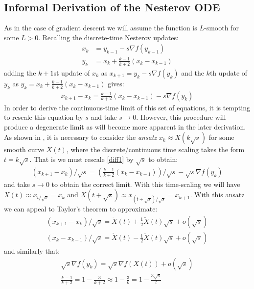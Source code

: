 \documentclass{article}
\begin{document}
\subsection{Informal Derivation of the Nesterov ODE}
As in the case of gradient descent we will assume the function is $L$-smooth for some $L > 0$. Recalling the discrete-time Nesterov updates:
\begin{align}
    x_k &= y_{k-1} - s \nabla f(y_{k-1})\\
    y_k &= x_k + \frac{k-1}{k+2} (x_k - x_{k-1}) \label{nesterov}
\end{align}
adding the $k+1$st update of $x_k$ as $x_{k+1} = y_k - s \nabla f(y_k)$ and the $k$th update of $y_k$ as $y_k = x_k + \frac{k-1}{k+2}(x_k-x_{k-1})$ gives:
\begin{align}
    x_{k+1} - x_{k} = \frac{k-1}{k+2}(x_{k}-x_{k-1}) - s \nabla f(y_k) \label{diff1}
\end{align}
In order to derive the continuous-time limit of this set of equations, it is tempting to rescale this equation by $s$ and take $s \to 0$. However, this procedure will produce a degenerate limit as will become more apparent in the later derivation. As shown in \cite{su2014differential}, it is necessary to consider the \textit{ansatz} $x_k \approx X(k \sqrt{s})$ for some smooth curve $X(t)$, where the discrete/continuous time scaling takes the form $t = k \sqrt{s}$. That is we must rescale \eqref{diff1} by $\sqrt{s}$ to obtain:
\begin{align}
    (x_{k+1} - x_{k})/\sqrt{s} = \left( \frac{k-1}{k+2}(x_{k}-x_{k-1}) \right)/\sqrt{s} - \sqrt{s} \nabla f(y_k) \label{diff2}
\end{align}
and take $s \to 0$ to obtain the correct limit. With this time-scaling we will have $X(t) \approx x_{t/\sqrt{s}} = x_k$ and $X(t+ \sqrt{s}) \approx x_{(t+\sqrt{s})/\sqrt{s}} = x_{k+1}$. With this ansatz we can appeal to Taylor's theorem to approximate:
\begin{align*}
    (x_{k+1}-x_{k})/\sqrt{s} = \dot{X}(t) + \frac{1}{2} \ddot{X}(t) \sqrt{s} + o(\sqrt{s})
    \\
    (x_k - x_{k-1})/\sqrt{s} = \dot{X}(t) - \frac{1}{2}\ddot{X}(t) \sqrt{s} + o(\sqrt{s})
\end{align*}
and similarly that:
\begin{align*}
    \sqrt{s} \nabla f(y_k) = \sqrt{s} \nabla f(X(t)) + o(\sqrt{s})
    \\
    \frac{k-1}{k+2} = 1 - \frac{3}{k+2} \approx 1 - \frac{3}{k} = 1 - \frac{3 \sqrt{s}}{t}
\end{align*}
\end{document}
